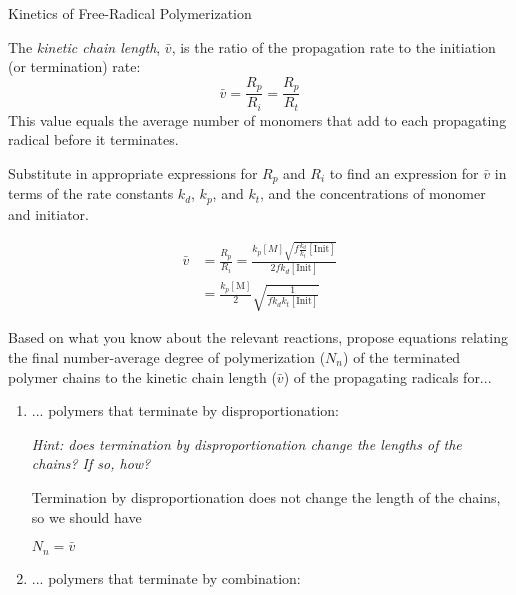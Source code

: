 \begin{activity}{Kinetics of Free-Radical Polymerization}
\begin{ctqs}
\end{ctqs}

\begin{infobox}\label{\labelbase:infobox:kineticchainlength}
	The \emph{kinetic chain length}, $\bar v$, is the ratio of the propagation rate to the initiation (or termination) rate:
	\begin{equation*}
		\bar v = \frac{R_p}{R_i} = \frac{R_p}{R_t}
	\end{equation*}
	This value equals the average number of monomers that add to each propagating radical before it terminates.
\end{infobox}

\begin{ctqs}

	\question Substitute in appropriate expressions for $R_p$ and $R_i$ to find an expression for $\bar v$ in terms of the rate constants $k_d$, $k_p$, and $k_t$, and the concentrations of monomer and initiator.
	
		\begin{solution}[2.5in]{}
			\begin{align*}
				\bar v &= \frac{R_p}{R_i} = \frac{k_p [M] \sqrt{f\frac{k_d}{k_t}[\text{Init}]}}{2fk_d[\text{Init}]}\\
					&= \frac{k_p[\text{M}]}{2}\sqrt{\frac{1}{f k_d k_t [\text{Init}]}}
			\end{align*}
		\end{solution}
		
	\question Based on what you know about the relevant reactions, propose equations relating the final number-average degree of polymerization ($N_n$) of the terminated polymer chains to the kinetic chain length ($\bar v$) of the propagating radicals for...
		
		\begin{enumerate}
		
			\item ... polymers that terminate by disproportionation:
			
				\emph{Hint: does termination by disproportionation change the lengths of the chains?  If so, how?}
				
				\begin{solution}[0.75in]{}
					Termination by disproportionation does not change the length of the chains, so we should have 
					
					$N_n = \bar v$
				\end{solution}
			
			\item ... polymers that terminate by combination:
			

\end{enumerate}
\end{ctqs}
\end{activity}
